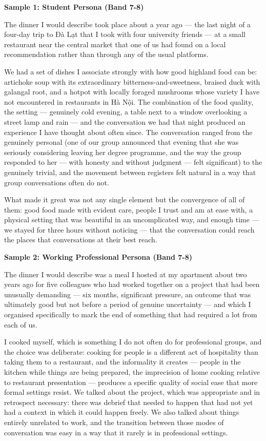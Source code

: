 \begin{ieltsanswer}
\textbf{Sample 1: Student Persona (Band 7-8)}

The dinner I would describe took place about a year ago — the last night of a four-day trip to Đà Lạt that I took with four university friends — at a small restaurant near the central market that one of us had found on a local recommendation rather than through any of the usual platforms.

We had a set of dishes I associate strongly with how good highland food can be: artichoke soup with its extraordinary bitterness-and-sweetness, braised duck with galangal root, and a hotpot with locally foraged mushrooms whose variety I have not encountered in restaurants in Hà Nội. The combination of the food quality, the setting — genuinely cold evening, a table next to a window overlooking a street lamp and rain — and the conversation we had that night produced an experience I have thought about often since. The conversation ranged from the genuinely personal (one of our group announced that evening that she was seriously considering leaving her degree programme, and the way the group responded to her — with honesty and without judgment — felt significant) to the genuinely trivial, and the movement between registers felt natural in a way that group conversations often do not.

What made it great was not any single element but the convergence of all of them: good food made with evident care, people I trust and am at ease with, a physical setting that was beautiful in an uncomplicated way, and enough time — we stayed for three hours without noticing — that the conversation could reach the places that conversations at their best reach.

\textbf{Sample 2: Working Professional Persona (Band 7-8)}

The dinner I would describe was a meal I hosted at my apartment about two years ago for five colleagues who had worked together on a project that had been unusually demanding — six months, significant pressure, an outcome that was ultimately good but not before a period of genuine uncertainty — and which I organised specifically to mark the end of something that had required a lot from each of us.

I cooked myself, which is something I do not often do for professional groups, and the choice was deliberate: cooking for people is a different act of hospitality than taking them to a restaurant, and the informality it creates — people in the kitchen while things are being prepared, the imprecision of home cooking relative to restaurant presentation — produces a specific quality of social ease that more formal settings resist. We talked about the project, which was appropriate and in retrospect necessary: there was debrief that needed to happen that had not yet had a context in which it could happen freely. We also talked about things entirely unrelated to work, and the transition between those modes of conversation was easy in a way that it rarely is in professional settings.


\end{ieltsanswer}
